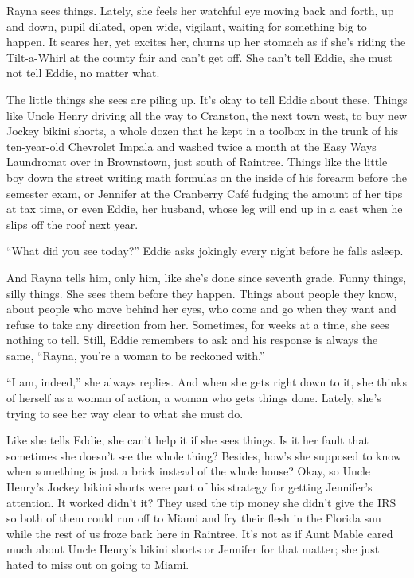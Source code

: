 \documentclass[twoside,10pt]{book}
\begin{document}
Rayna sees things. Lately, she feels her watchful eye moving back and
forth, up and down, pupil dilated, open wide, vigilant, waiting for
something big to happen. It scares her, yet excites her, churns up her
stomach as if she's riding the Tilt-a-Whirl at the county fair and can't
get off. She can't tell Eddie, she must not tell Eddie, no matter what.

The little things she sees are piling up. It's okay to tell Eddie about
these. Things like Uncle Henry driving all the way to Cranston, the next
town west, to buy new Jockey bikini shorts, a whole dozen that he kept
in a toolbox in the trunk of his ten-year-old Chevrolet Impala and
washed twice a month at the Easy Ways Laundromat over in Brownstown,
just south of Raintree. Things like the little boy down the street
writing math formulas on the inside of his forearm before the semester
exam, or Jennifer at the Cranberry Café fudging the amount of her tips
at tax time, or even Eddie, her husband, whose leg will end up in a cast
when he slips off the roof next year.

``What did you see today?'' Eddie asks jokingly every night before he
falls asleep.

And Rayna tells him, only him, like she's done since seventh grade.
Funny things, silly things. She sees them before they happen. Things
about people they know, about people who move behind her eyes, who come
and go when they want and refuse to take any direction from her.
Sometimes, for weeks at a time, she sees nothing to tell. Still, Eddie
remembers to ask and his response is always the same, ``Rayna, you're a
woman to be reckoned with.''

``I am, indeed,'' she always replies. And when she gets right down to
it, she thinks of herself as a woman of action, a woman who gets things
done. Lately, she's trying to see her way clear to what she must do.

Like she tells Eddie, she can't help it if she sees things. Is it her
fault that sometimes she doesn't see the whole thing? Besides, how's she
supposed to know when something is just a brick instead of the whole
house? Okay, so Uncle Henry's Jockey bikini shorts were part of his
strategy for getting Jennifer's attention. It worked didn't it? They
used the tip money she didn't give the IRS so both of them could run off
to Miami and fry their flesh in the Florida sun while the rest of us
froze back here in Raintree. It's not as if Aunt Mable cared much about
Uncle Henry's bikini shorts or Jennifer for that matter; she just hated
to miss out on going to Miami.
\end{document}
